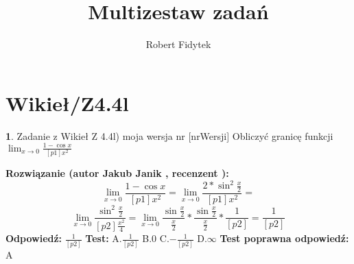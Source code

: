 \documentclass[12pt, a4paper]{article}
\title{Multizestaw zadań}
\author{Robert Fidytek}
\date{}
\theoremstyle{definition} %
\newtheorem{zad}{}
\newcommand{\kategoria}[1]{\section{#1}} %
\newcommand{\zadStart}[1]{\begin{zad}#1\newline} %
\newcommand{\zadStop}{\end{zad}}   %
\newcommand{\rozwStart}[2]{\noindent \textbf{Rozwiązanie (autor #1 , recenzent #2): }\newline} %
\newcommand{\rozwStop}{\newline}                                            %
\newcommand{\odpStart}{\noindent \textbf{Odpowiedź:}\newline}    %
\newcommand{\odpStop}{\newline}                                             %
\newcommand{\testStart}{\noindent \textbf{Test:}\newline} %
\newcommand{\testStop}{\newline} %
\newcommand{\kluczStart}{\noindent \textbf{Test poprawna odpowiedź:}\newline} %
\newcommand{\kluczStop}{\newline} %
\begin{document}
\maketitle


\kategoria{Wikieł/Z4.4l}
\zadStart{Zadanie z Wikieł Z 4.4l) moja wersja nr [nrWersji]}
Obliczyć granicę funkcji $\lim_{x \to 0} \frac{1-\cos{x}}{[p1]x^2}$
\zadStop
\rozwStart{Jakub Janik}{}
$$\lim_{x \to 0} \frac{1-\cos{x}}{[p1]x^2}=\lim_{x \to 0} \frac{2*\sin^2{\frac{x}{2}}}{[p1]x^2}=$$
$$\lim_{x \to 0} \frac{\sin^2{\frac{x}{2}}}{[p2]\frac{x^2}{4}}=\lim_{x \to 0} \frac{\sin{\frac{x}{2}}}{\frac{x}{2}}*\frac{\sin{\frac{x}{2}}}{\frac{x}{2}}*\frac{1}{[p2]}=\frac{1}{[p2]}$$
\rozwStop
\odpStart
$\frac{1}{[p2]}$
\odpStop
\testStart
A.$\frac{1}{[p2]}$
B.$0$
C.$-\frac{1}{[p2]}$
D.$\infty$
\testStop
\kluczStart
A
\kluczStop
\end{document}
